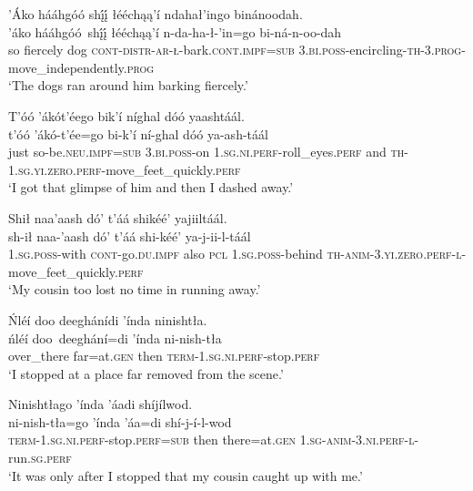 \ea\label{ex:text6-5-13}
’Áko hááhgóó shį́į́ łééchąą’í ndahał’ingo binánoodah.\\
\gll ’áko	hááhgóó~{shį́į́}	łééchąą’í	n-da-ha-ł-’in=go	bi-ná-n-oo-dah\\
     so	fiercely	dog	\textsc{cont}-\textsc{distr}-\textsc{ar}-\textsc{ł}-bark.\textsc{cont}.\textsc{impf}=\textsc{sub}	3.\textsc{bi}.\textsc{poss}-encircling-\textsc{th}-3.\textsc{prog}-move\_independently.\textsc{prog}\\
\glt `The dogs ran around him barking fiercely.'
\z

\ea\label{ex:text6-5-14}
T’óó ’ákót’éego bik’í níghal dóó yaashtáál.\\
\gll t’óó	’ákó-t’ée=go	bi-k’í	ní-ghal	dóó	ya-ash-táál\\
     just	so-be.\textsc{neu}.\textsc{impf}=\textsc{sub}	3.\textsc{bi}.\textsc{poss}-on	1.\textsc{sg}.\textsc{ni}.\textsc{perf}-roll\_eyes.\textsc{perf}	and	\textsc{th}-1.\textsc{sg}.\textsc{yi}.\textsc{zero}.\textsc{perf}-move\_feet\_quickly.\textsc{perf}\\
\glt `I got that glimpse of him and then I dashed away.'
\z

\ea\label{ex:text6-5-15}
Shił naa’aash dó’ t’áá shikéé’ yajiiltáál.\\
\gll sh-ił	naa-’aash	dó’	t’áá	shi-kéé’	ya-j-ii-l-táál\\
     1.\textsc{sg}.\textsc{poss}-with	\textsc{cont}-go.\textsc{du}.\textsc{impf}	also	\textsc{pcl}	1.\textsc{sg}.\textsc{poss}-behind	\textsc{th}-\textsc{anim}-3.\textsc{yi}.\textsc{zero}.\textsc{perf}-\textsc{l}-move\_feet\_quickly.\textsc{perf}\\
\glt `My cousin too lost no time in running away.'
\z

\ea\label{ex:text6-5-16}
Ńléí doo deeghánídi ’índa ninishtła.\\
\gll ńléí	doo~{deeghání=di}	’índa	ni-nish-tła\\
     over\_there	far=at.\textsc{gen}	then	\textsc{term}-1.\textsc{sg}.\textsc{ni}.\textsc{perf}-stop.\textsc{perf}\\
\glt `I stopped at a place far removed from the scene.'
\z

\ea\label{ex:text6-5-17}
Ninishtłago ’índa ’áadi shíjílwod.\\
\gll ni-nish-tła=go	’índa	’áa=di	shí-j-í-l-wod\\
     \textsc{term}-1.\textsc{sg}.\textsc{ni}.\textsc{perf}-stop.\textsc{perf}=\textsc{sub}	then	there=at.\textsc{gen}	1.\textsc{sg}-\textsc{anim}-3.\textsc{ni}.\textsc{perf}-\textsc{l}-run.\textsc{sg}.\textsc{perf}\\
\glt `It was only after I stopped that my cousin caught up with me.'
\z

